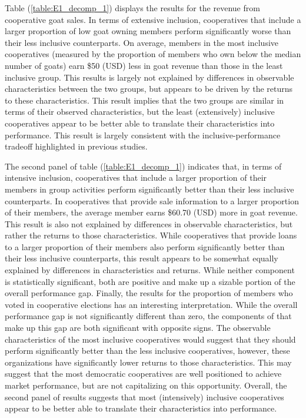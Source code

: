 \documentclass[11pt]{article}
\begin{document}
\begin{figure}[H]
\begin{subfigure}[t]{0.49\textwidth}
    \end{subfigure}
\end{figure}

Table (\ref{table:E1_decomp_1}) displays the results for the revenue from cooperative goat sales. In terms of extensive inclusion, cooperatives that include a larger proportion of low goat owning members perform significantly worse than their less inclusive counterparts. On average, members in the most inclusive cooperatives (measured by the proportion of members who own below the median number of goats) earn \$50 (USD) less in goat revenue than those in the least inclusive group. This results is largely not explained by differences in observable characteristics between the two groups, but appears to be driven by the returns to these characteristics. This result implies that the two groups are similar in terms of their observed characteristics, but the least (extensively) inclusive cooperatives appear to be better able to translate their characteristics into performance. This result is largely consistent with the inclusive-performance tradeoff highlighted in previous studies. 

The second panel of table (\ref{table:E1_decomp_1}) indicates that, in terms of intensive inclusion, cooperatives that include a larger proportion of their members in group activities perform significantly better than their less inclusive counterparts. In cooperatives that provide sale information to a larger proportion of their members, the average member earns \$60.70 (USD) more in goat revenue. This result is also not explained by differences in observable characteristics, but rather the returns to those characteristics. While cooperatives that provide loans to a larger proportion of their members also perform significantly better than their less inclusive counterparts, this result appears to be somewhat equally explained by differences in characteristics and returns. While neither component is statistically significant, both are positive and make up a sizable portion of the overall performance gap. Finally, the results for the proportion of members who voted in cooperative elections has an interesting interpretation. While the overall performance gap is not significantly different than zero, the components of that make up this gap are both significant with opposite signs. The observable characteristics of the most inclusive cooperatives would suggest that they should perform significantly better than the less inclusive cooperatives, however, these organizations have significantly lower returns to those characteristics. This may suggest that the most democratic cooperatives are well positioned to achieve market performance, but are not capitalizing on this opportunity. Overall, the second panel of results suggests that most (intensively) inclusive cooperatives appear to be better able to translate their characteristics into performance.  
\end{document}

